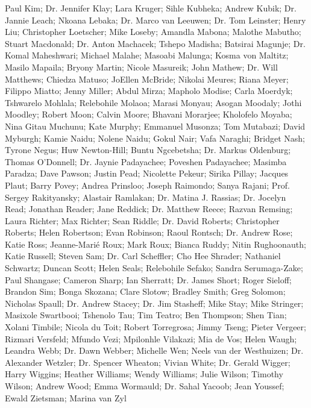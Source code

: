     Paul Kim;
Dr. Jennifer Klay;
    Lara Kruger;
    Sihle Kubheka;
    Andrew Kubik;
Dr. Jannie Leach;
    Nkoana Lebaka;
Dr. Marco van Leeuwen;
Dr. Tom Leinster;
    Henry Liu;
    Christopher Loetscher;
    Mike Loseby;
    Amandla Mabona;
    Malothe Mabutho;
    Stuart Macdonald;
Dr. Anton Machacek;
    Tshepo Madisha;
    Batsirai Magunje;
Dr. Komal Maheshwari;
    Michael Malahe;
    Masoabi Malunga;
    Kosma von Maltitz;
    Masilo Mapaila;
    Bryony Martin;
    Nicole Masureik;
    John Mathew;
Dr. Will Matthews;
    Chiedza Matuso;
    JoEllen McBride;
    Nikolai Meures;
    Riana Meyer;
    Filippo Miatto;
    Jenny Miller;
    Abdul Mirza;
    Mapholo Modise;
    Carla Moerdyk;
    Tshwarelo Mohlala;
    Relebohile Molaoa;
    Marasi Monyau;
    Asogan Moodaly;
    Jothi Moodley;
    Robert Moon;
    Calvin Moore;
    Bhavani Morarjee;
    Kholofelo Moyaba;
    Nina Gitau Muchunu;
    Kate Murphy;
    Emmanuel Musonza;
    Tom Mutabazi;
    David Myburgh;
    Kamie Naidu;
    Nolene Naidu;
    Gokul Nair;
    Vafa Naraghi;
    Bridget Nash;
    Tyrone Negus;
    Huw Newton-Hill;
    Buntu Ngcebetsha;
Dr. Markus Oldenburg;
    Thomas O’Donnell;
Dr. Jaynie Padayachee;
    Poveshen Padayachee;
    Masimba Paradza;
    Dave Pawson;
    Justin Pead;
    Nicolette Pekeur;
    Sirika Pillay;
    Jacques Plaut;
    Barry Povey;
    Andrea Prinsloo;
    Joseph Raimondo;
    Sanya Rajani;
Prof. Sergey Rakityansky;
    Alastair Ramlakan;
Dr. Matina J. Rassias;
Dr. Jocelyn Read;
    Jonathan Reader;
    Jane Reddick;
Dr. Matthew Reece;
    Razvan Remsing;
    Laura Richter;
    Max Richter;
    Sean Riddle;
Dr. David Roberts;
    Christopher Roberts;
    Helen Robertson;
    Evan Robinson;
    Raoul Rontsch;
Dr. Andrew Rose;
    Katie Ross;
    Jeanne-Marié Roux;
    Mark Roux;
    Bianca Ruddy;
    Nitin Rughoonauth;
    Katie Russell;
    Steven Sam;
Dr. Carl Scheffler;
    Cho Hee Shrader;
    Nathaniel Schwartz;
    Duncan Scott;
    Helen Seals;
    Relebohile Sefako;
    Sandra Serumaga-Zake;
    Paul Shangase;
    Cameron Sharp;
    Ian Sherratt;
Dr. James Short;
    Roger Sieloff;
    Brandon Sim;
    Bonga Skozana;
    Clare Slotow;
    Bradley Smith;
    Greg Solomon;
    Nicholas Spaull;
Dr. Andrew Stacey;
Dr. Jim Stasheff;
    Mike Stay;
    Mike Stringer;
    Masixole Swartbooi;
    Tshenolo Tau;
    Tim Teatro;
    Ben Thompson;
    Shen Tian;
    Xolani Timbile;
    Nicola du Toit;
    Robert Torregrosa;
    Jimmy Tseng;
    Pieter Vergeer;
    Rizmari Versfeld;
    Mfundo Vezi;
    Mpilonhle Vilakazi;
    Mia de Vos;
    Helen Waugh;
    Leandra Webb;
Dr. Dawn Webber;
    Michelle Wen;
    Neels van der Westhuizen;
Dr. Alexander Wetzler;
Dr. Spencer Wheaton;
    Vivian White;
Dr. Gerald Wigger;
    Harry Wiggins;
    Heather Williams;
    Wendy Williams;
    Julie Wilson;
    Timothy Wilson;
    Andrew Wood;
    Emma Wormauld;
Dr. Sahal Yacoob;
    Jean Youssef;
    Ewald Zietsman; 
    Marina van Zyl

